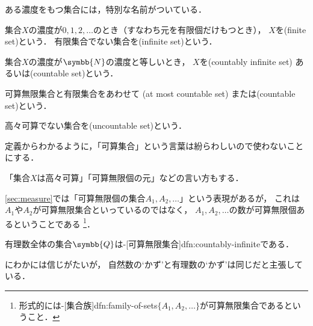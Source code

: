 \documentclass[../sotsu.tex]{subfiles}
\begin{document}
ある濃度をもつ集合には，特別な名前がついている．

\begin{definition}[有限集合]
    集合$X$の濃度が$0, 1, 2, \dotsc$のとき（すなわち元を有限個だけもつとき），
    $X$を(finite set)という．
    有限集合でない集合を(infinite set)という．
\end{definition}

\begin{definition}[\ruby{可算}{か|さん}集合]
    \label{dfn:countably-infinite}
    集合$X$の濃度が$\symbb{N}$の濃度と等しいとき，
    $X$を(countably infinite set)%
    あるいは(countable set)という．
\end{definition}

\begin{definition}
    \label{dfn:at-most-countable}
    可算無限集合と有限集合をあわせて%
    (at most countable set)%
    または(countable set)という．

    高々可算でない集合を(uncountable set)という．
\end{definition}

定義からわかるように，「可算集合」という言葉は紛らわしいので使わないことにする．

「集合$X$は高々可算」「可算無限個の元」などの言い方もする．

\cref{sec:measure}では「可算無限個の集合$A_1, A_2, \dotsc$」という表現があるが，
これは$A_1$や$A_2$が可算無限集合といっているのではなく，
$A_1, A_2, \dotsc$の数が可算無限個あるということである%
\footnote{
    形式的には-[集合族]{dfn:family-of-sets}$\{ A_1, A_2, \dotsc \}$が可算無限集合であるということ．
}．


\begin{proposition}
    \label{thm:rational-numbers-are-countable}
    有理数全体の集合$\symbb{Q}$は-[可算無限集合]{dfn:countably-infinite}である．
\end{proposition}

にわかには信じがたいが，
自然数の`かず'と有理数の`かず'は同じだと主張している．
\end{document}

